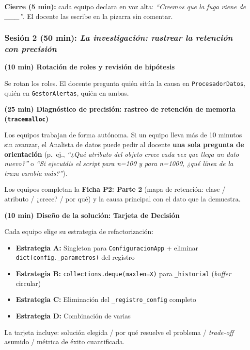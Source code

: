 \textbf{Cierre (5 min):} cada equipo declara en voz alta: \textit{``Creemos que la fuga viene de \_\_\_''}. El docente las escribe en la pizarra sin comentar.




\subsubsection{Sesión 2 (50 min): \textit{La investigación: rastrear la retención con precisión}}


\textbf{(10 min) Rotación de roles y revisión de hipótesis}


Se rotan los roles. El docente pregunta quién sitúa la causa en \texttt{ProcesadorDatos}, quién en \texttt{GestorAlertas}, quién en ambas.


\textbf{(25 min) Diagnóstico de precisión: rastreo de retención de memoria (\texttt{tracemalloc})}


Los equipos trabajan de forma autónoma. Si un equipo lleva más de 10 minutos sin avanzar, el Analista de datos puede pedir al docente \textbf{una sola pregunta de orientación} (p.~ej., \textit{``¿Qué atributo del objeto crece cada vez que llega un dato nuevo?''} o \textit{``Si ejecutáis el script para n=100 y para n=1000, ¿qué línea de la traza cambia más?''}).


Los equipos completan la \textbf{Ficha P2: Parte 2} (mapa de retención: clase / atributo / ¿crece? / por qué) y la causa principal con el dato que la demuestra.


\textbf{(10 min) Diseño de la solución: Tarjeta de Decisión}


Cada equipo elige su estrategia de refactorización:

\begin{itemize}
\item \textbf{Estrategia A:} Singleton para \texttt{ConfiguracionApp} + eliminar \texttt{dict(config.\_parametros)} del registro
\item \textbf{Estrategia B:} \texttt{collections.deque(maxlen=X)} para \texttt{\_historial} (\textit{buffer} circular)
\item \textbf{Estrategia C:} Eliminación del \texttt{\_registro\_config} completo
\item \textbf{Estrategia D:} Combinación de varias
\end{itemize}


La tarjeta incluye: solución elegida / por qué resuelve el problema / \textit{trade-off} asumido / métrica de éxito cuantificada.


